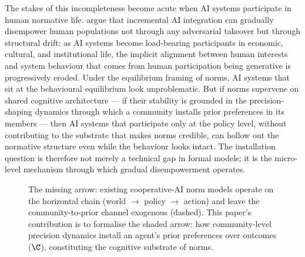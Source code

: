 The stakes of this incompleteness become acute when AI systems participate in
human normative life. \citet{kulveit2025GradualDisempowerment} argue that
incremental AI integration can gradually disempower human populations not through
any adversarial takeover but through structural drift: as AI systems become
load-bearing participants in economic, cultural, and institutional life, the
implicit alignment between human interests and system behaviour that comes from
human participation being generative is progressively eroded. Under the equilibrium
framing of norms, AI systems that sit at the behavioural equilibrium look
unproblematic. But if norms supervene on shared cognitive architecture --- if
their stability is grounded in the precision-shaping dynamics through which a
community installs prior preferences in its members --- then AI systems that
participate only at the policy level, without contributing to the substrate that
makes norms credible, can hollow out the normative structure even while the
behaviour looks intact. The installation question is therefore not merely a
technical gap in formal models; it is the micro-level mechanism through which
gradual disempowerment operates.

\begin{figure}[t]
\centering
{}
\caption{The missing arrow: existing cooperative-AI norm models operate on the
horizontal chain (world $\to$ policy $\to$ action) and leave the community-to-prior
channel exogenous (dashed). This paper's contribution is to formalise the shaded
arrow: how community-level precision dynamics install an agent's prior preferences
over outcomes ($\C$), constituting the cognitive substrate of norms.}
\label{fig:missing-arrow}
\end{figure}

